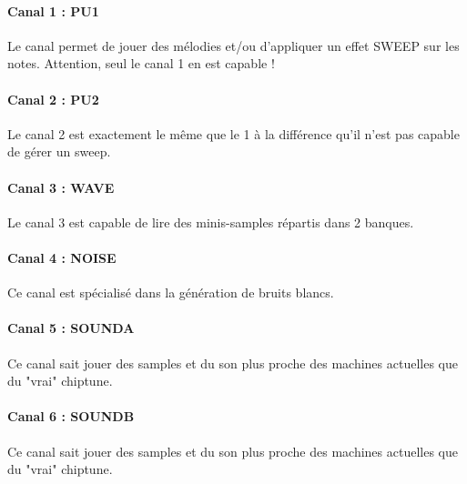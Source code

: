 \paragraph{Canal 1 : PU1} Le canal permet de jouer des mélodies et/ou d'appliquer un effet SWEEP sur les notes. Attention, seul le canal 1 en est capable !


\paragraph{Canal 2 : PU2} Le canal 2 est exactement le même que le 1 à la différence qu'il n'est pas capable de gérer un sweep.


\paragraph{Canal 3 : WAVE} Le canal 3 est capable de lire des minis-samples répartis dans 2 banques.


\paragraph{Canal 4 : NOISE} Ce canal est spécialisé dans la génération de bruits blancs.


\paragraph{Canal 5 : SOUNDA} Ce canal sait jouer des samples et du son plus proche des machines actuelles que du "vrai" chiptune.

\paragraph{Canal 6 : SOUNDB} Ce canal sait jouer des samples et du son plus proche des machines actuelles que du "vrai" chiptune.


